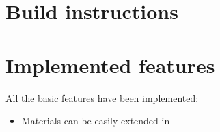 \documentclass{article}
\begin{document}
\section{Build instructions}
\section{Implemented features}

All the basic features have been implemented:
\begin{itemize}
\item Materials can be easily extended in \texttt{} 
\end{itemize}
\end{document}
